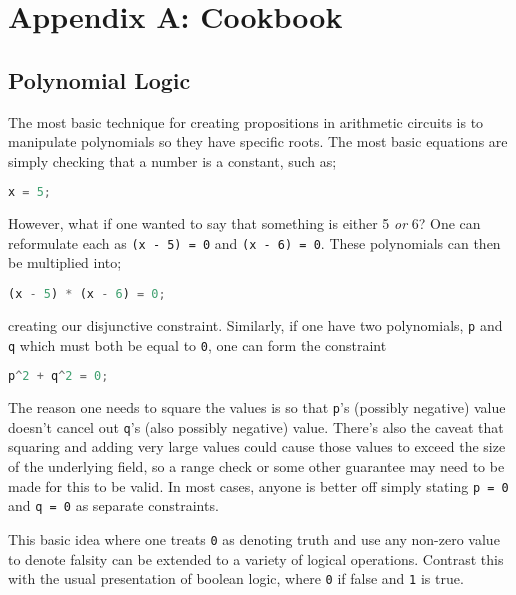 \section{Appendix A: Cookbook}

\subsection{Polynomial Logic}

The most basic technique for creating propositions in arithmetic circuits is to manipulate polynomials so they have specific roots. The most basic equations are simply checking that a number is a constant, such as;

\begin{lstlisting}[language=Python]
  x = 5;
\end{lstlisting}

However, what if one wanted to say that something is either 5 \textit{or} 6? One can reformulate each as \lstinline{(x - 5) = 0} and \lstinline{(x - 6) = 0}. These polynomials can then be multiplied into;

\begin{lstlisting}[language=Python]
  (x - 5) * (x - 6) = 0;
\end{lstlisting}

creating our disjunctive constraint. Similarly, if one have two polynomials, \lstinline{p} and \lstinline{q} which must both be equal to \lstinline{0}, one can form the constraint

\begin{lstlisting}[language=Python]
  p^2 + q^2 = 0;
\end{lstlisting}

The reason one needs to square the values is so that \lstinline{p}'s (possibly negative) value doesn't cancel out \lstinline{q}'s (also possibly negative) value. There's also the caveat that squaring and adding very large values could cause those values to exceed the size of the underlying field, so a range check or some other guarantee may need to be made for this to be valid. In most cases, anyone is better off simply stating \lstinline{p = 0} and \lstinline{q = 0} as separate constraints.

This basic idea where one treats \lstinline{0} as denoting truth and use any non-zero value to denote falsity can be extended to a variety of logical operations. Contrast this with the usual presentation of boolean logic, where \lstinline{0} if false and \lstinline{1} is true. 

